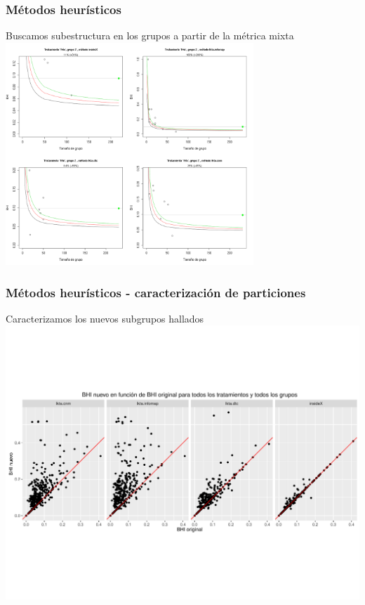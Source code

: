 \documentclass[serif,9pt, t]{beamer}
\begin{document}
\begin{frame}\frametitle{Métodos heurísticos} 
\centering
Buscamos subestructura en los grupos a partir de la métrica mixta
\centering
\includegraphics[width=0.7\textwidth]{metodos_mixtos_grupo_2.png}
\end{frame}

\begin{frame}\frametitle{Métodos heurísticos - caracterización de particiones} 
\centering
Caracterizamos los nuevos subgrupos hallados
\centering
\includegraphics[width=1\textwidth]{bhi_nuevo_vs_bhi_original.pdf}
\end{frame}
\end{document}
